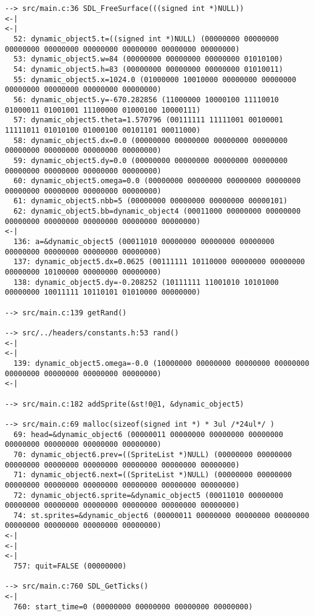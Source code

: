 \begin{verbatim}
--> src/main.c:36 SDL_FreeSurface(((signed int *)NULL))
<-|
<-|
  52: dynamic_object5.t=((signed int *)NULL) (00000000 00000000 00000000 00000000 00000000 00000000 00000000 00000000)
  53: dynamic_object5.w=84 (00000000 00000000 00000000 01010100)
  54: dynamic_object5.h=83 (00000000 00000000 00000000 01010011)
  55: dynamic_object5.x=1024.0 (01000000 10010000 00000000 00000000 00000000 00000000 00000000 00000000)
  56: dynamic_object5.y=-670.282856 (11000000 10000100 11110010 01000011 01001001 11100000 01000100 10000111)
  57: dynamic_object5.theta=1.570796 (00111111 11111001 00100001 11111011 01010100 01000100 00101101 00011000)
  58: dynamic_object5.dx=0.0 (00000000 00000000 00000000 00000000 00000000 00000000 00000000 00000000)
  59: dynamic_object5.dy=0.0 (00000000 00000000 00000000 00000000 00000000 00000000 00000000 00000000)
  60: dynamic_object5.omega=0.0 (00000000 00000000 00000000 00000000 00000000 00000000 00000000 00000000)
  61: dynamic_object5.nbb=5 (00000000 00000000 00000000 00000101)
  62: dynamic_object5.bb=dynamic_object4 (00011000 00000000 00000000 00000000 00000000 00000000 00000000 00000000)
<-|
  136: a=&dynamic_object5 (00011010 00000000 00000000 00000000 00000000 00000000 00000000 00000000)
  137: dynamic_object5.dx=0.0625 (00111111 10110000 00000000 00000000 00000000 10100000 00000000 00000000)
  138: dynamic_object5.dy=-0.208252 (10111111 11001010 10101000 00000000 10011111 10110101 01010000 00000000)

--> src/main.c:139 getRand()

--> src/../headers/constants.h:53 rand()
<-|
<-|
  139: dynamic_object5.omega=-0.0 (10000000 00000000 00000000 00000000 00000000 00000000 00000000 00000000)
<-|

--> src/main.c:182 addSprite(&st!0@1, &dynamic_object5)

--> src/main.c:69 malloc(sizeof(signed int *) * 3ul /*24ul*/ )
  69: head=&dynamic_object6 (00000011 00000000 00000000 00000000 00000000 00000000 00000000 00000000)
  70: dynamic_object6.prev=((SpriteList *)NULL) (00000000 00000000 00000000 00000000 00000000 00000000 00000000 00000000)
  71: dynamic_object6.next=((SpriteList *)NULL) (00000000 00000000 00000000 00000000 00000000 00000000 00000000 00000000)
  72: dynamic_object6.sprite=&dynamic_object5 (00011010 00000000 00000000 00000000 00000000 00000000 00000000 00000000)
  74: st.sprites=&dynamic_object6 (00000011 00000000 00000000 00000000 00000000 00000000 00000000 00000000)
<-|
<-|
<-|
  757: quit=FALSE (00000000)

--> src/main.c:760 SDL_GetTicks()
<-|
  760: start_time=0 (00000000 00000000 00000000 00000000)


\end{verbatim}
